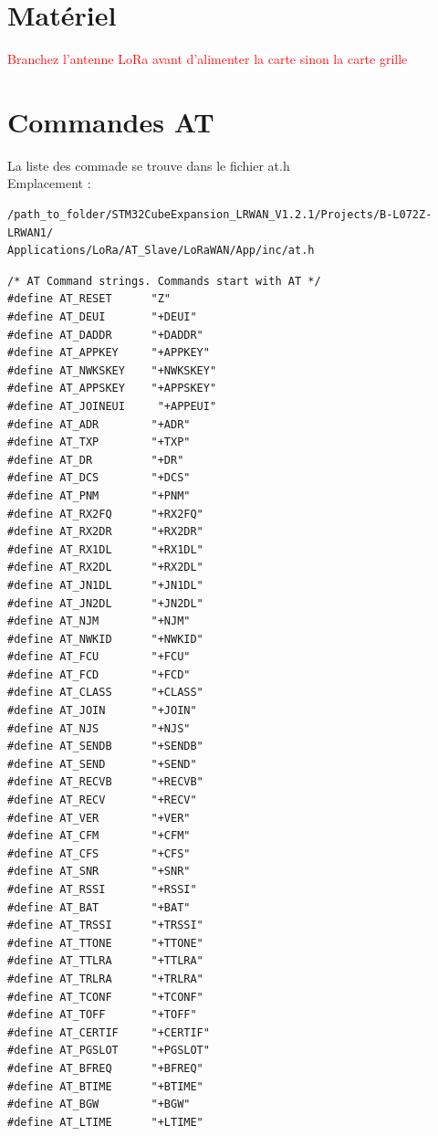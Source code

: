 \documentclass{article}
\begin{document}
 \section{Matériel}


\textcolor{red}{Branchez l'antenne LoRa avant d'alimenter la carte sinon la carte grille}


\section{Commandes AT}

La liste des commade se trouve dans le fichier at.h \\

Emplacement :
\begin{verbatim}
/path_to_folder/STM32CubeExpansion_LRWAN_V1.2.1/Projects/B-L072Z-LRWAN1/
Applications/LoRa/AT_Slave/LoRaWAN/App/inc/at.h
\end{verbatim}





\begin{verbatim}
/* AT Command strings. Commands start with AT */
#define AT_RESET      "Z"
#define AT_DEUI       "+DEUI"
#define AT_DADDR      "+DADDR"
#define AT_APPKEY     "+APPKEY"
#define AT_NWKSKEY    "+NWKSKEY"
#define AT_APPSKEY    "+APPSKEY"
#define AT_JOINEUI     "+APPEUI" 
#define AT_ADR        "+ADR"
#define AT_TXP        "+TXP"
#define AT_DR         "+DR"
#define AT_DCS        "+DCS"
#define AT_PNM        "+PNM"
#define AT_RX2FQ      "+RX2FQ"
#define AT_RX2DR      "+RX2DR"
#define AT_RX1DL      "+RX1DL"
#define AT_RX2DL      "+RX2DL"
#define AT_JN1DL      "+JN1DL"
#define AT_JN2DL      "+JN2DL"
#define AT_NJM        "+NJM"
#define AT_NWKID      "+NWKID"
#define AT_FCU        "+FCU"
#define AT_FCD        "+FCD"
#define AT_CLASS      "+CLASS"
#define AT_JOIN       "+JOIN"
#define AT_NJS        "+NJS"
#define AT_SENDB      "+SENDB"
#define AT_SEND       "+SEND"
#define AT_RECVB      "+RECVB"
#define AT_RECV       "+RECV"
#define AT_VER        "+VER"
#define AT_CFM        "+CFM"
#define AT_CFS        "+CFS"
#define AT_SNR        "+SNR"
#define AT_RSSI       "+RSSI"
#define AT_BAT        "+BAT"
#define AT_TRSSI      "+TRSSI"
#define AT_TTONE      "+TTONE"
#define AT_TTLRA      "+TTLRA"
#define AT_TRLRA      "+TRLRA"
#define AT_TCONF      "+TCONF"
#define AT_TOFF       "+TOFF"
#define AT_CERTIF     "+CERTIF"
#define AT_PGSLOT     "+PGSLOT" 
#define AT_BFREQ      "+BFREQ"
#define AT_BTIME      "+BTIME"
#define AT_BGW        "+BGW" 
#define AT_LTIME      "+LTIME" 
\end{verbatim}
\end{document}
